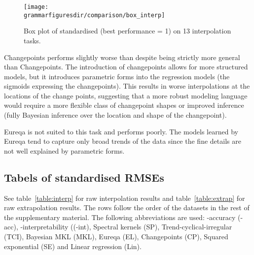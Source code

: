 \begin{figure*}[ht]
\centering
\texttt{[image: \\grammarfiguresdir/comparison/box\_interp]}
\caption[Comparision of interpolation error of all methods on 13 time-series datasets.]
{Box plot of standardised \RMSE{} (best performance = 1) on 13 interpolation tasks.}
\label{fig:box_interp}
\end{figure*}

Changepoints performs slightly worse than \MKL{} despite being strictly more general than Changepoints.
The introduction of changepoints allows for more structured models, but it introduces parametric forms into the regression models (\ie the sigmoids expressing the changepoints).
This results in worse interpolations at the locations of the change points, suggesting that a more robust modeling language would require a more flexible class of changepoint shapes or improved inference (\eg fully Bayesian inference over the location and shape of the changepoint).

Eureqa is not suited to this task and performs poorly.
The models learned by Eureqa tend to capture only broad trends of the data since the fine details are not well explained by parametric forms.

\subsection{Tabels of standardised RMSEs}

See table~\ref{table:interp} for raw interpolation results and table~\ref{table:extrap} for raw extrapolation results. 
The rows follow the order of the datasets in the rest of the supplementary material.
The following abbreviations are used: \procedurename{}-accuracy (\procedurename{}-acc), \procedurename{}-interpretability ((\procedurename{}-int), Spectral kernels (SP), Trend-cyclical-irregular (TCI), Bayesian MKL (MKL), Eureqa (EL), Changepoints (CP), Squared exponential (SE) and Linear regression (Lin).

